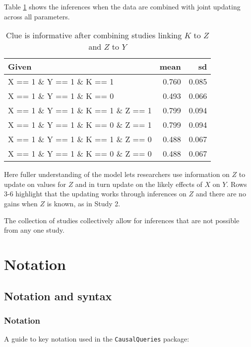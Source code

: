 \documentclass[
  12pt,
]{book}
\begin{document}
Table \ref{tab:frank4} shows the inferences when the data are combined with joint updating across all parameters.

\begin{table}

\caption{\label{tab:frank4}Clue is informative after combining studies linking $K$ to $Z$ and $Z$ to $Y$}
\centering
\begin{tabular}[t]{l|r|r}
\hline
Given & mean & sd\\
\hline
X == 1 \& Y == 1 \& K == 1 & 0.760 & 0.085\\
\hline
X == 1 \& Y == 1 \& K == 0 & 0.493 & 0.066\\
\hline
X == 1 \& Y == 1 \& K == 1 \& Z == 1 & 0.799 & 0.094\\
\hline
X == 1 \& Y == 1 \& K == 0 \& Z == 1 & 0.799 & 0.094\\
\hline
X == 1 \& Y == 1 \& K == 1 \& Z == 0 & 0.488 & 0.067\\
\hline
X == 1 \& Y == 1 \& K == 0 \& Z == 0 & 0.488 & 0.067\\
\hline
\end{tabular}
\end{table}

Here fuller understanding of the model lets researchers use information on \(Z\) to update on values for \(Z\) and in turn update on the likely effects of \(X\) on \(Y\). Rows 3-6 highlight that the updating works through inferences on \(Z\) and there are no gains when \(Z\) is known, as in Study 2.

The collection of studies collectively allow for inferences that are not possible from any one study.

\hypertarget{part-notation}{%
\part{Notation}\label{part-notation}}

\hypertarget{notation}{%
\chapter{Notation and syntax}\label{notation}}

\hypertarget{notation-1}{%
\section{Notation}\label{notation-1}}

A guide to key notation used in the \texttt{CausalQueries} package:
\end{document}
